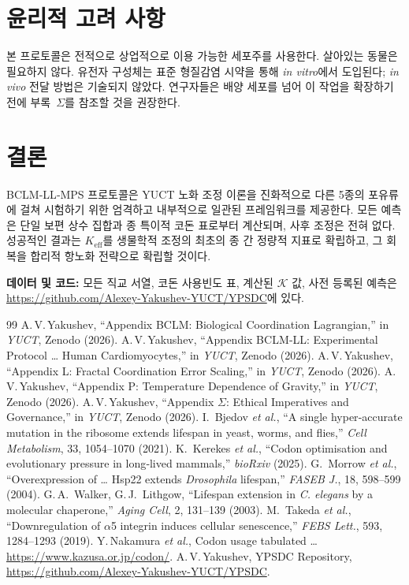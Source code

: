 \documentclass[12pt,a4paper]{article}
\newcommand{\REL}{\mathcal{K}}          %
\begin{document}
	\section{윤리적 고려 사항}
	\label{sec:ethics}
	본 프로토콜은 전적으로 상업적으로 이용 가능한 세포주를 사용한다. 살아있는 동물은 필요하지 않다. 유전자 구성체는 표준 형질감염 시약을 통해 \textit{in vitro}에서 도입된다; \textit{in vivo} 전달 방법은 기술되지 않았다. 연구자들은 배양 세포를 넘어 이 작업을 확장하기 전에 부록~\(\Sigma\)를 참조할 것을 권장한다.
	
	\section{결론}
	\label{sec:conclusion}
	BCLM‑LL‑MPS 프로토콜은 YUCT 노화 조정 이론을 진화적으로 다른 5종의 포유류에 걸쳐 시험하기 위한 엄격하고 내부적으로 일관된 프레임워크를 제공한다. 모든 예측은 단일 보편 상수 집합과 종 특이적 코돈 표로부터 계산되며, 사후 조정은 전혀 없다. 성공적인 결과는 \(K_{\mathrm{eff}}\)를 생물학적 조정의 최초의 종 간 정량적 지표로 확립하고, 그 회복을 합리적 항노화 전략으로 확립할 것이다.
	
	\vspace{0.5cm}
	\noindent\textbf{데이터 및 코드:} 모든 직교 서열, 코돈 사용빈도 표, 계산된 \(\REL\) 값, 사전 등록된 예측은 \url{https://github.com/Alexey-Yakushev-YUCT/YPSDC}에 있다.
	
	\begin{thebibliography}{99}
		 A.\,V.\,Yakushev, ``Appendix BCLM: Biological Coordination Lagrangian,'' in \emph{YUCT}, Zenodo (2026).
		 A.\,V.\,Yakushev, ``Appendix BCLM‑LL: Experimental Protocol … Human Cardiomyocytes,'' in \emph{YUCT}, Zenodo (2026).
		 A.\,V.\,Yakushev, ``Appendix L: Fractal Coordination Error Scaling,'' in \emph{YUCT}, Zenodo (2026).
		 A.\,V.\,Yakushev, ``Appendix P: Temperature Dependence of Gravity,'' in \emph{YUCT}, Zenodo (2026).
		 A.\,V.\,Yakushev, ``Appendix \(\Sigma\): Ethical Imperatives and Governance,'' in \emph{YUCT}, Zenodo (2026).
		 I.~Bjedov \emph{et al.}, ``A single hyper‑accurate mutation in the ribosome extends lifespan in yeast, worms, and flies,'' \emph{Cell Metabolism}, 33, 1054–1070 (2021).
		 K.~Kerekes \emph{et al.}, ``Codon optimisation and evolutionary pressure in long‑lived mammals,'' \emph{bioRxiv} (2025).
		 G.~Morrow \emph{et al.}, ``Overexpression of … Hsp22 extends \textit{Drosophila} lifespan,'' \emph{FASEB J.}, 18, 598–599 (2004).
		 G.\,A.~Walker, G.\,J.~Lithgow, ``Lifespan extension in \textit{C. elegans} by a molecular chaperone,'' \emph{Aging Cell}, 2, 131–139 (2003).
		 M.~Takeda \emph{et al.}, ``Downregulation of \(\alpha\)5 integrin induces cellular senescence,'' \emph{FEBS Lett.}, 593, 1284–1293 (2019).
		 Y.\,Nakamura \emph{et al.}, Codon usage tabulated … \url{https://www.kazusa.or.jp/codon/}.
		 A.\,V.\,Yakushev, YPSDC Repository, \url{https://github.com/Alexey-Yakushev-YUCT/YPSDC}.
	\end{thebibliography}
	
\end{document}

